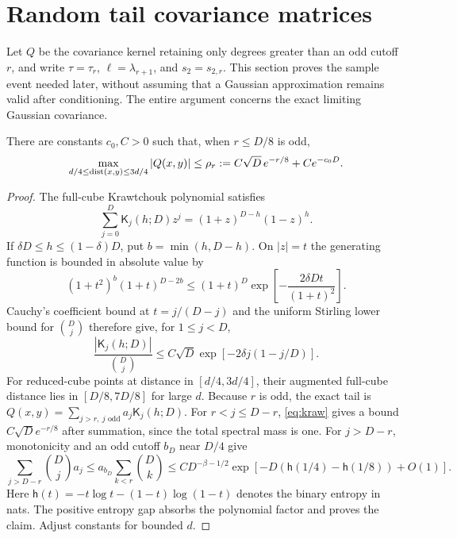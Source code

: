 \section{Random tail covariance matrices}\label{app:gram}
Let $Q$ be the covariance kernel retaining only degrees greater than an
odd cutoff $r$, and write $\tau=\tau_r$, $\ell=\lambda_{r+1}$, and
$s_2=s_{2,r}$. This section proves the sample event needed later, without
assuming that a Gaussian approximation remains valid after conditioning.
The entire argument concerns the exact limiting Gaussian covariance.

\begin{lemma}\label{lem:far}
There are constants $c_0,C>0$ such that, when $r\le D/8$ is odd,
\[
 \max_{d/4\le\operatorname{dist}(x,y)\le3d/4}|Q(x,y)|
 \le\rho_r:=C\sqrt D\,e^{-r/8}+Ce^{-c_0D}.
\]
\end{lemma}
\begin{proof}
The full-cube Krawtchouk polynomial satisfies
\[
 \sum_{j=0}^D\mathsf K_j(h;D)z^j=(1+z)^{D-h}(1-z)^h.
\]
If $\delta D\le h\le(1-\delta)D$, put $b=\min(h,D-h)$.
On $|z|=t$ the generating function is bounded in absolute value by
\[
 (1+t^2)^b(1+t)^{D-2b}
 \le(1+t)^D\exp\!\left[-\frac{2\delta Dt}{(1+t)^2}\right].
\]
Cauchy's coefficient bound at $t=j/(D-j)$ and the uniform Stirling
lower bound for $\binom Dj$ therefore give, for $1\le j<D$,
\begin{equation}\label{eq:kraw}
 \frac{|\mathsf K_j(h;D)|}{\binom Dj}
 \le C\sqrt D\exp[-2\delta j(1-j/D)].
\end{equation}
For reduced-cube points at distance in $[d/4,3d/4]$, their augmented
full-cube distance lies in $[D/8,7D/8]$ for large $d$.
Because $r$ is odd, the exact tail is
$Q(x,y)=\sum_{j>r,\ j\text{ odd}}a_j\mathsf K_j(h;D)$.
For $r<j\le D-r$, \eqref{eq:kraw} gives a bound
$C\sqrt D e^{-r/8}$ after summation, since the total spectral mass
is one. For $j>D-r$, monotonicity and an odd cutoff $b_D$ near $D/4$
give
\[
 \sum_{j>D-r}\binom Dj a_j
 \le a_{b_D}\sum_{k<r}\binom Dk
 \le C D^{-\beta-1/2}
       \exp[-D(\mathsf h(1/4)-\mathsf h(1/8))+O(1)].
\]
Here $\mathsf h(t)=-t\log t-(1-t)\log(1-t)$ denotes the binary entropy in nats.
The positive entropy gap absorbs the polynomial factor and proves the
claim. Adjust constants for bounded $d$.
\end{proof}

